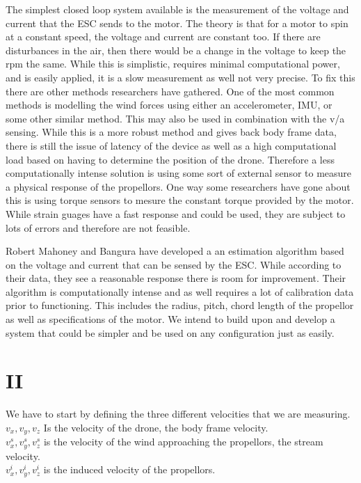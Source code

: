 \documentclass[twocolumn]{article}
\begin{document}
	The simplest closed loop system available is the measurement of the voltage and current that the ESC sends to the motor. The theory is that for a motor to spin at a constant speed, the voltage and current are constant too. If there are disturbances in the air, then there would be a change in the voltage to keep the rpm the same. While this is simplistic, requires minimal computational power, and is easily applied,  it is a slow measurement as well not very precise. To fix this there are other methods researchers have gathered. One of the most common methods is modelling the wind forces using either an accelerometer, IMU, or some other similar method. This may also be used in combination with the v/a sensing. While this is a more robust method and gives back body frame data, there is still the issue of latency of the device as well as a high computational load based on having to determine the position of the drone. Therefore a less computationally intense solution is using some sort of external sensor to measure a physical response of the propellors. One way some researchers have gone about this is using torque sensors to mesure the constant torque provided by the motor. While strain guages have a fast response and could be used, they are subject to lots of errors and therefore are not feasible. 
	
	Robert Mahoney and Bangura have developed a an estimation algorithm based on the voltage and current that can be sensed by the ESC. While according to their data, they see a reasonable response there is room for improvement. Their algorithm is computationally intense and as well requires a lot of calibration data prior to functioning. This includes the radius, pitch, chord length of the propellor as well as specifications of the motor. We intend to build upon and develop a system that could be simpler and be used on any configuration just as easily. 
	
	\section{II}
	We have to start by defining the three different velocities that we are measuring.\\
	
	$v_{x} , v_{y} , v_{z}$  Is the velocity of the drone, the body frame velocity. \\
	$v^s_{x} , v^s_{y} , v^s_{z}$ is the velocity of the wind approaching the propellors, the stream velocity. \\
	$v^i_{x} , v^i_{y} , v^i_{z}$ is the induced velocity of the propellors.\\
	
\end{document}
